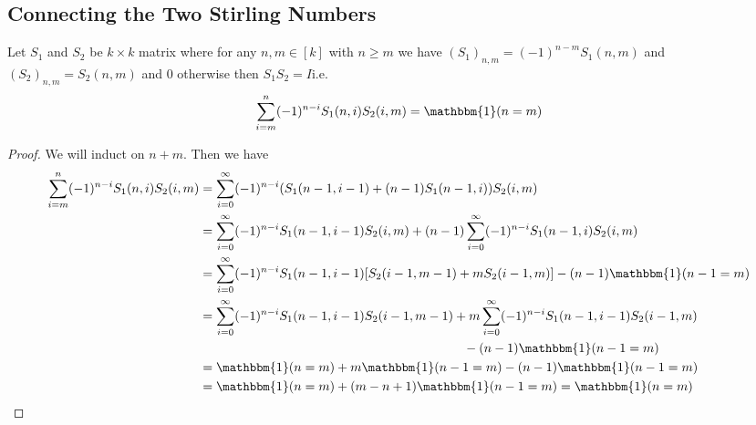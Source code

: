 \subsection{Connecting the Two Stirling Numbers}
\begin{Theorem}{}{}
	Let $S_1$ and $S_2$ be $k\times k$ matrix where for any $n,m\in [k]$ with $n\geq m$ we have $(S_1)_{n,m}=(-1)^{n-m}S_1(n,m)$ and $(S_2)_{n,m}=S_2(n,m)$ and $0$ otherwise then $S_1S_2=I$i.e. $$\displaystyle\sum\limits_{i=m}^n(-1)^{n-i}S_1(n,i)S_2(i,m)=\mathbbm{1}(n=m)$$
\end{Theorem}
\begin{proof}
We will induct on $n+m$. Then we have \begin{align*}
	\sum\limits_{i=m}^n(-1)^{n-i}S_1(n,i)S_2(i,m) & = \sum_{i=0}^{\infty} (-1)^{n-i}(S_1(n-1,i-1)+(n-1)S_1(n-1,i))S_2(i,m)\\
	& = \sum_{i=0}^{\infty} (-1)^{n-i}S_1(n-1,i-1)S_2(i,m)+ (n-1)\sum_{i=0}^{\infty} (-1)^{n-i}S_1(n-1,i)S_2(i,m)\\
	& = \sum_{i=0}^{\infty} (-1)^{n-i}S_1(n-1,i-1)[S_2(i-1,m-1)+mS_2(i-1,m)] - (n-1)\mathbbm{1}(n-1=m)\\
	& = \sum_{i=0}^{\infty} (-1)^{n-i}S_1(n-1,i-1)S_2(i-1,m-1)+m\sum_{i=0}^{\infty} (-1)^{n-i}S_1(n-1,i-1)S_2(i-1,m)\\
	& \hskip0.6\textwidth-(n-1)\mathbbm{1}(n-1=m)\\
	& = \mathbbm{1}(n=m)+m\mathbbm{1}(n-1=m)-(n-1)\mathbbm{1}(n-1=m)\\
	& =  \mathbbm{1}(n=m)+(m-n+1)\mathbbm{1}(n-1=m)= \mathbbm{1}(n=m)
\end{align*}
\end{proof}
